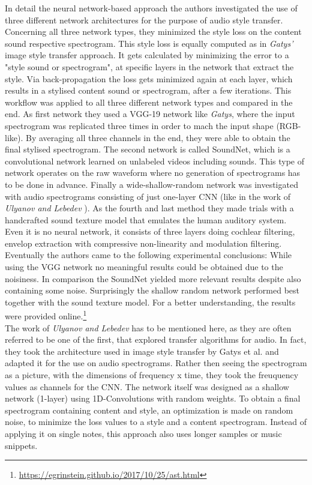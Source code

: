 In detail the neural network-based approach the authors investigated the use of three different network architectures for the purpose of audio style transfer. Concerning all three network types, they minimized the style loss on the content sound respective spectrogram. This style loss is equally computed as in \textit{Gatys'} image style transfer approach. It gets calculated by minimizing the error to a "style sound or spectrogram", at specific layers in the network that extract the style. Via back-propagation the loss gets minimized again at each layer, which results in a stylised content sound or spectrogram, after a few iterations. This workflow was applied to all three different network types and compared in the end. As first network they used a VGG-19 network like \textit{Gatys}, where the input spectrogram was replicated three times in order to mach the input shape (RGB-like). By averaging all three channels in the end, they were able to obtain the final stylised spectrogram. The second network is called SoundNet, which is a convolutional network learned on unlabeled videos including sounds. This type of network operates on the raw waveform where no generation of spectrograms has to be done in advance. Finally a wide-shallow-random network was investigated with audio spectrograms consisting of just one-layer CNN (like in the work of \textit{Ulyanov and Lebedev} \cite{ulyanov2016audio}). As the fourth and last method they made trials with a handcrafted sound texture model that emulates the human auditory system. Even it is no neural network, it consists of three layers doing cochlear filtering, envelop extraction with compressive non-linearity and modulation filtering.\\
Eventually the authors came to the following experimental conclusions: While using the VGG network no meaningful results could be obtained due to the noisiness. In comparison the SoundNet yielded more relevant results despite also containing some noise. Surprisingly the shallow random network performed best together with the sound texture model. For a better understanding, the results were provided online.\footnote{\url{https://egrinstein.github.io/2017/10/25/ast.html}}\\

The work of \textit{Ulyanov and Lebedev} has to be mentioned here, as they are often referred to be one of the first, that explored transfer algorithms for audio. \cite{ulyanov2016audio} In fact, they took the architecture used in image style transfer by Gatys et al. and adapted it for the use on audio spectrograms. Rather then seeing the spectrogram as a picture, with the dimensions of frequency x time, they took the freuquency values as channels for the CNN. The network itself was designed as a shallow network (1-layer) using 1D-Convolutions with random weights. To obtain a final spectrogram containing content and style, an optimization is made on random noise, to minimize the loss values to a style and a content spectrogram. Instead of applying it on single notes, this approach also uses longer samples or music snippets. 

